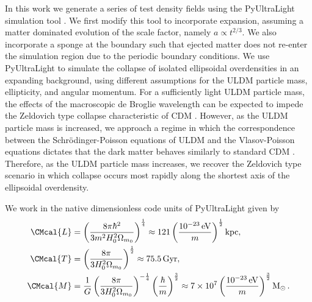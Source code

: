 \documentclass[a4paper,11pt]{article}
\begin{document}
In this work we generate a series of test density fields using the {\sc PyUltraLight} simulation tool \cite{Edwards:2018ccc}. We first modify this tool to incorporate expansion, assuming a matter dominated evolution of the scale factor, namely $a\propto t^{2/3}$. We also incorporate a sponge at the boundary such that ejected matter does not re-enter the simulation region due to the periodic boundary conditions. We use {\sc PyUltraLight} to simulate the collapse of isolated ellipsoidal overdensities in an expanding background, using different assumptions for the ULDM particle mass, ellipticity, and angular momentum. For a sufficiently light ULDM particle mass, the effects of the macroscopic de Broglie wavelength can be expected to impede the Zeldovich type collapse characteristic of CDM \cite{Zeldovich:1969sb}. However, as the ULDM particle mass is increased, we approach a regime in which the correspondence between the Schr{\"o}dinger-Poisson equations of ULDM and the Vlasov-Poisson equations dictates that the dark matter behaves similarly to standard CDM \cite{Mocz:2018ium}. Therefore, as the ULDM particle mass increases, we recover the Zeldovich type scenario in which collapse occurs most rapidly along the shortest axis of the ellipsoidal overdensity. 

We work in the native dimensionless code units of {\sc PyUltraLight} given by 
\begin{align}
    \CMcal{L}&=\left(\frac{8\pi\hbar^2}{3 m^2H_0^2\Omega_{m_0}}\right)^{\frac{1}{4}}\approx121\left(\frac{10^{-23}\operatorname{eV}}{m}\right)^{\frac{1}{2}}\operatorname{kpc},\label{eq:length}\\
    \CMcal{T}&=\left(\frac{8\pi}{3 H_0^2\Omega_{m_0}}\right)^{\frac{1}{2}}\approx75.5 \operatorname{Gyr},\label{eq:time}\\
    \CMcal{M}&=\frac{1}{G}\left(\frac{8\pi}{3 H_0^2\Omega_{m_0}}\right)^{-\frac{1}{4}}\left(\frac{\hbar}{m}\right)^{\frac{3}{2}}\approx 7\times 10^7\left(\frac{10^{-23}\operatorname{eV}}{m}\right)^{\frac{3}{2}}\operatorname{M}_{\odot}.\label{eq:mass}
\end{align}
\end{document}
